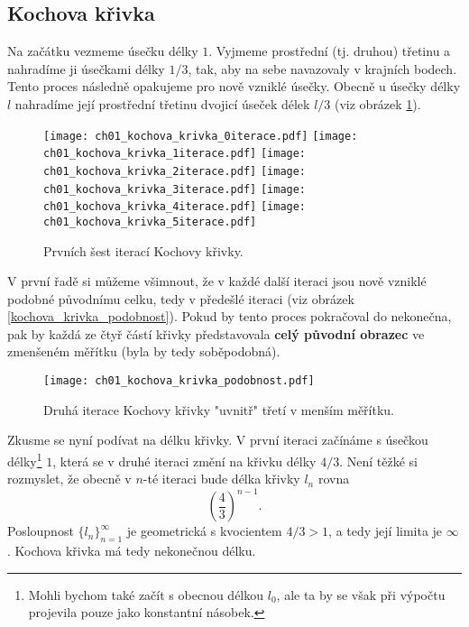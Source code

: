 \subsection{Kochova křivka}\label{subsec:kochova_krivka}
Na začátku vezmeme úsečku délky $1$. Vyjmeme prostřední (tj. druhou) třetinu a nahradíme ji úsečkami délky $1/3$, tak, aby na sebe navazovaly v krajních bodech. Tento proces následně opakujeme pro nově vzniklé úsečky. Obecně u úsečky délky $l$ nahradíme její prostřední třetinu dvojicí úseček délek $l/3$ (viz obrázek \ref{fig:kochova_krivka_6iteraci}).
\begin{figure}[h]
    \centering
    \texttt{[image: ch01\_kochova\_krivka\_0iterace.pdf]}\qquad
    \texttt{[image: ch01\_kochova\_krivka\_1iterace.pdf]}\qquad
    \texttt{[image: ch01\_kochova\_krivka\_2iterace.pdf]}\qquad
    \texttt{[image: ch01\_kochova\_krivka\_3iterace.pdf]}\qquad
    \texttt{[image: ch01\_kochova\_krivka\_4iterace.pdf]}\qquad
    \texttt{[image: ch01\_kochova\_krivka\_5iterace.pdf]}
    \caption{Prvních šest iterací Kochovy křivky.}
    \label{fig:kochova_krivka_6iteraci}
\end{figure}
V první řadě si můžeme všimnout, že v každé další iteraci jsou nově vzniklé podobné původnímu celku, tedy v předešlé iteraci (viz obrázek \ref{kochova_krivka_podobnost}). Pokud by tento proces pokračoval do nekonečna, pak by každá ze čtyř částí křivky představovala \textbf{celý původní obrazec} ve zmenšeném měřítku (byla by tedy soběpodobná).
\begin{figure}[h]
    \centering
    \texttt{[image: ch01\_kochova\_krivka\_podobnost.pdf]}
    \caption{Druhá iterace Kochovy křivky "uvnitř" třetí v menším měřítku.}
    \label{fig:kochova_krivka_podobnost}
\end{figure}
Zkusme se nyní podívat na délku křivky. V první iteraci začínáme s úsečkou délky\footnote{Mohli bychom také začít s obecnou délkou $l_0$, ale ta by se však při výpočtu projevila pouze jako konstantní násobek.} $1$, která se v druhé iteraci změní na křivku délky $4/3$. Není těžké si rozmyslet, že obecně v $n$-té iteraci bude délka křivky $l_n$ rovna
\begin{equation*}
    \left(\dfrac{4}{3}\right)^{n-1}.
\end{equation*}
Posloupnost $\{l_n\}_{n=1}^{\infty}$ je geometrická s kvocientem $4/3>1$, a tedy její limita je $\infty$. Kochova křivka má tedy nekonečnou délku.